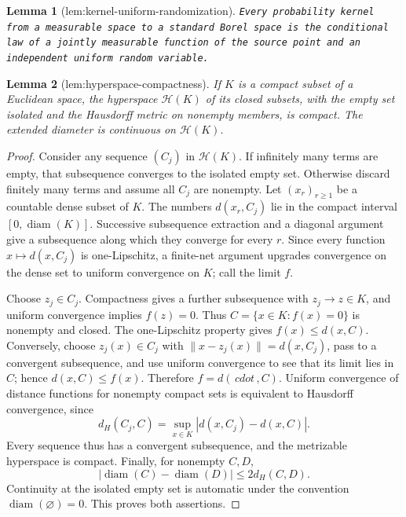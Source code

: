 \documentclass{article}
\newtheorem{lemma}{Lemma}
\begin{document}
\begin{lemma}[lem:kernel-uniform-randomization]\label{lem:kernel-uniform-randomization}
\texttt{Every probability kernel from a measurable space to a standard Borel space is the conditional law of a jointly measurable function of the source point and an independent uniform random variable.}
\end{lemma}

\begin{lemma}[lem:hyperspace-compactness]\label{lem:hyperspace-compactness}
If \(K\) is a compact subset of a Euclidean space, the hyperspace \(\mathcal H(K)\) of its closed subsets, with the empty set isolated and the Hausdorff metric on nonempty members, is compact.  The extended diameter is continuous on \(\mathcal H(K)\).
\end{lemma}
\begin{proof}
Consider any sequence \((C_j)\) in \(\mathcal H(K)\).  If infinitely many terms are empty, that subsequence converges to the isolated empty set.  Otherwise discard finitely many terms and assume all \(C_j\) are nonempty.  Let \((x_r)_{r\ge1}\) be a countable dense subset of \(K\).  The numbers \(d(x_r,C_j)\) lie in the compact interval \([0,\operatorname{diam}(K)]\).  Successive subsequence extraction and a diagonal argument give a subsequence along which they converge for every \(r\).  Since every function \(x\mapsto d(x,C_j)\) is one-Lipschitz, a finite-net argument upgrades convergence on the dense set to uniform convergence on \(K\); call the limit \(f\).

Choose \(z_j\in C_j\).  Compactness gives a further subsequence with \(z_j\to z\in K\), and uniform convergence implies \(f(z)=0\).  Thus \(C=\{x\in K:f(x)=0\}\) is nonempty and closed.  The one-Lipschitz property gives \(f(x)\le d(x,C)\).  Conversely, choose \(z_j(x)\in C_j\) with \(\|x-z_j(x)\|=d(x,C_j)\), pass to a convergent subsequence, and use uniform convergence to see that its limit lies in \(C\); hence \(d(x,C)\le f(x)\).  Therefore \(f=d(\,cdot\,,C)\).  Uniform convergence of distance functions for nonempty compact sets is equivalent to Hausdorff convergence, since
\[
 d_H(C_j,C)=\sup_{x\in K}|d(x,C_j)-d(x,C)|.
\]
Every sequence thus has a convergent subsequence, and the metrizable hyperspace is compact.  Finally, for nonempty \(C,D\),
\[
 |\operatorname{diam}(C)-\operatorname{diam}(D)|\le2d_H(C,D).
\]
Continuity at the isolated empty set is automatic under the convention \(\operatorname{diam}(\varnothing)=0\).  This proves both assertions.
\end{proof}
\end{document}
